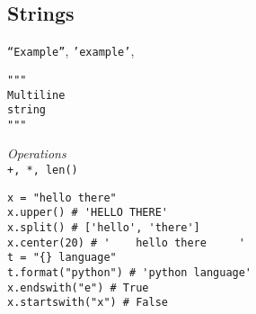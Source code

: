 \subsection{Strings}
\texttt{``Example''}, \texttt{'example'},
\begin{verbatim}
"""
Multiline
string
"""
\end{verbatim}
\textit{Operations} \\
\texttt{+, *, len()}

\begin{lstlisting}
x = "hello there"
x.upper() # 'HELLO THERE'
x.split() # ['hello', 'there']
x.center(20) # '    hello there     '
t = "{} language"
t.format("python") # 'python language'
x.endswith("e") # True
x.startswith("x") # False
\end{lstlisting}
